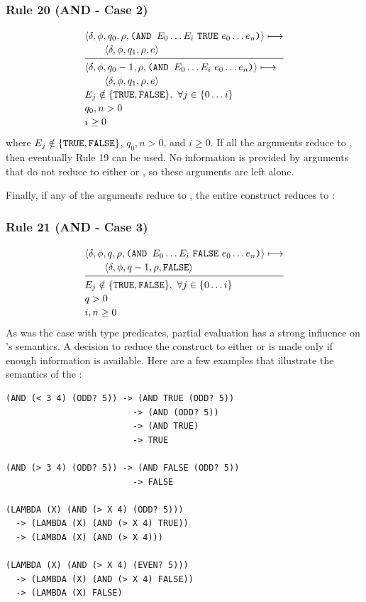 \subsubsection*{Rule 20 (AND - Case 2)}
\[
\semanticrule{
\cfg{\delta}{\phi}{q_0}{\rho}{\THOR{(AND }E_0\ldots E_i\ \THOR{TRUE}\ e_0\ldots e_n\THOR{)}}\redsto\\ \qquad
\cfg{\delta}{\phi}{q_1}{\rho}{e}
}{
\cfg{\delta}{\phi}{q_0-1}{\rho}{\THOR{(AND }E_0\ldots E_i\ e_0\ldots e_n\THOR{)}}\redsto\\ \qquad
\cfg{\delta}{\phi}{q_1}{\rho}{e}\\
E_j\notin\{\THOR{TRUE},\THOR{FALSE}\},\ \forall j\in\{0\ldots i\}\\ q_0,n>0\\ i\ge0
}
\]
where \(E_j\notin\{\texttt{TRUE},\texttt{FALSE}\}\), \(q_0,n>0\), and \(i\ge0\).
If all the arguments reduce to , then eventually Rule 19 can be used.
No information is provided by arguments that do not reduce to either
 or , so these arguments are left alone.

Finally, if any of the arguments reduce to , the entire 
construct reduces to :

\subsubsection*{Rule 21 (AND - Case 3)}
\[
\semanticrule{
\cfg{\delta}{\phi}{q}{\rho}{\THOR{(AND }E_0\ldots E_i\ \THOR{FALSE}\ e_0\ldots e_n\THOR{)}}\redsto\\ \qquad
      \cfg{\delta}{\phi}{q-1}{\rho}{\THOR{FALSE}}
}{
E_j\notin\{\THOR{TRUE},\THOR{FALSE}\},\ \forall j\in\{0\ldots i\}\\ q>0\\ i,n\ge0
}
\]
As was the case with type predicates, partial evaluation has a strong influence
on 's semantics. A decision to reduce the  construct to
either  or  is made only if enough information is
available. Here are a few examples that illustrate the semantics of the
:
\begin{verbatim}
(AND (< 3 4) (ODD? 5)) -> (AND TRUE (ODD? 5))
                         -> (AND (ODD? 5))
                         -> (AND TRUE)
                         -> TRUE

(AND (> 3 4) (ODD? 5)) -> (AND FALSE (ODD? 5))
                         -> FALSE

(LAMBDA (X) (AND (> X 4) (ODD? 5)))
  -> (LAMBDA (X) (AND (> X 4) TRUE))
  -> (LAMBDA (X) (AND (> X 4)))

(LAMBDA (X) (AND (> X 4) (EVEN? 5)))
  -> (LAMBDA (X) (AND (> X 4) FALSE))
  -> (LAMBDA (X) FALSE)
\end{verbatim}

